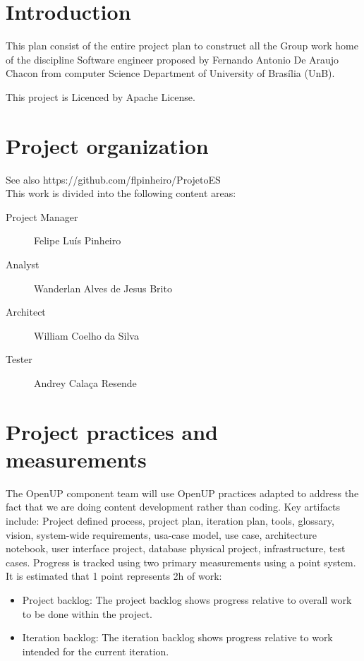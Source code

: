 \section*{Introduction}

This plan consist of the entire project plan to construct all the Group work home of the  discipline Software engineer proposed by Fernando Antonio De Araujo Chacon from computer Science Department of University of Brasília (UnB).

This project is Licenced by Apache License.

\section*{Project organization}

See also https://github.com/flpinheiro/ProjetoES \\
This work is divided into the following content areas:\\
\begin{description}
	\item[Project Manager] Felipe Luís Pinheiro
	\item[Analyst] Wanderlan Alves de Jesus Brito
	\item[Architect] William Coelho da Silva
	\item[Tester] Andrey Calaça Resende
\end{description}

\section*{Project practices and measurements}

The OpenUP component team will use OpenUP practices adapted to address the fact that we are doing content development rather than coding. Key artifacts include: Project defined process, project plan, iteration plan, tools, glossary, vision, system-wide requirements, usa-case model, use case, architecture notebook, user interface  project, database physical project, infrastructure, test cases.
Progress is tracked using two primary measurements using a point system. It is estimated that 1 point represents 2h of work:
\begin{itemize}
	\item Project backlog: The project backlog shows progress relative to overall work to be done within the project.
	\item Iteration backlog: The iteration backlog shows progress relative to work intended for the current iteration.
\end{itemize}

